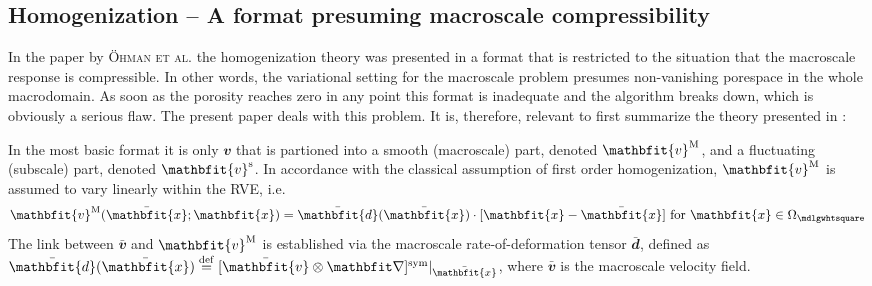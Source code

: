 \documentclass[12pt,review]{elsarticle}
\renewcommand{\ta}[1]{\mathbfit{#1}}
\renewcommand{\ts}[1]{\mathbfit{#1}}
\renewcommand{\Box}{\mdlgwhtsquare}
\begin{document}
\subsection{Homogenization -- A format presuming macroscale compressibility}\label{sec:homogencompress}

In the paper by \textsc{\"Ohman et al.} \cite{Ohman2012a} the homogenization theory was presented in a format that is restricted to the situation that the macroscale response is compressible.
In other words, the variational setting for the macroscale problem presumes non-vanishing porespace in the whole macrodomain.
As soon as the porosity reaches zero in any point this format is inadequate and the algorithm breaks down, which is obviously a serious flaw. The present paper deals with this problem.
It is, therefore, relevant to first summarize the theory presented in \cite{Ohman2012a}:

In the most basic format it is only $\ta v$ that is partioned into a smooth (macroscale) part, denoted $\ta{v}^\macro$, and a fluctuating (subscale) part, denoted $\ta{v}^\fluct$. In accordance with the classical assumption of first order homogenization, $\ta{v}^\macro$ is assumed to vary linearly within the RVE, i.e.
\begin{equation}
  \ta{v}^\macro(\bar{\ta{x}};\ta x) = \bar{\ts d}(\bar{\ta x}) \cdot [\ta{x}-\bar{\ta x}] \text{ for }\ta{x}\in\Omega_{\Box}
\label{eq:vm_prolongation}
\end{equation}
The link between $\bar{\ta v}$ and $\ta v^\macro$ is established via the macroscale rate-of-deformation tensor $\bar{\ts d}$, defined as
$\bar{\ts d}(\bar{\ta x})\defeq [\bar{\ta v}\outerp \diff]^\sym|_{\bar{\ta x}}$, where $\bar{\ta v}$ is the macroscale velocity field.
\end{document}
